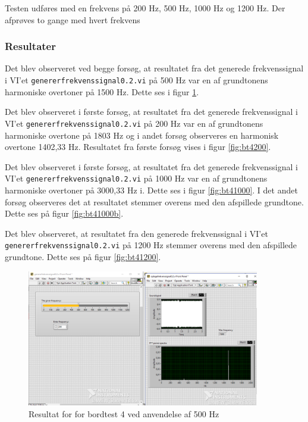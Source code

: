 			
			Testen udføres med en frekvens på 200 Hz, 500 Hz, 1000 Hz og 1200 Hz. Der afprøves to gange med hvert frekvens  
			
			\subsubsection{Resultater}
			Det blev observeret ved begge forsøg, at resultatet fra det generede frekvenssignal i VI'et \texttt{genererfrekvenssignal0.2.vi} på 500 Hz var en af grundtonens harmoniske overtoner på 1500 Hz. Dette ses i figur \ref{fig:bt4500}. 

			 Det blev observeret i første forsøg, at resultatet fra det generede frekvenssignal i VI'et \texttt{genererfrekvenssignal0.2.vi} på 200 Hz var en af grundtonens harmoniske overtone på 1803 Hz og i andet forsøg observeres en harmonisk overtone 1402,33 Hz. Resultatet fra første forsøg vises i figur \ref{fig:bt4200}.
			 
			 Det blev observeret i første forsøg, at resultatet fra det generede frekvenssignal i VI'et \texttt{genererfrekvenssignal0.2.vi} på 1000 Hz var en af grundtonens harmoniske overtoner på 3000,33 Hz i. Dette ses i figur \ref{fig:bt41000}. I det andet forsøg observeres det at resultatet stemmer overens med den afspillede grundtone. Dette ses på figur \ref{fig:bt41000b}.  
			 
			 Det blev observeret, at resultatet fra den generede frekvenssignal i VI'et \texttt{genererfrekvenssignal0.2.vi} på 1200 Hz stemmer overens med den afspillede grundtone. Dette ses på figur \ref{fig:bt41200}.  
			 
			\begin{figure}[htb]
			\centering
				\includegraphics[width=4in]{Bordtest4500Hz}
				\caption{Resultat for for bordtest 4 ved anvendelse af 500 Hz}	
				\label{fig:bt4500}
			\end{figure} 
			
